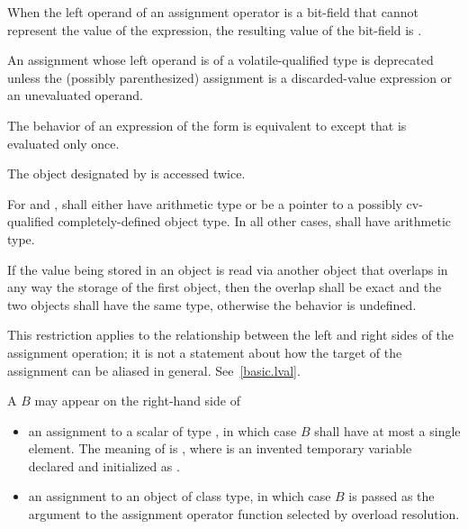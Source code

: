 \pnum
{}%
When the left operand of an assignment operator
is a bit-field that cannot represent the value of the expression, the
resulting value of the bit-field is
.

\pnum
An assignment whose left operand is of
a volatile-qualified type is deprecated
unless the (possibly parenthesized) assignment is a discarded-value expression or
an unevaluated operand.

\pnum
The behavior of an expression of the form 
is equivalent to  except
that  is evaluated only once.
\begin{note}
The object designated by  is accessed twice.
\end{note}
For \tcode{+=} and \tcode{-=},
 shall either have arithmetic type or be a pointer to a
possibly cv-qualified completely-defined object type. In all other
cases,  shall have arithmetic type.

\pnum
If the value being stored in an object is read via another object that
overlaps in any way the storage of the first object, then the overlap shall be
exact and the two objects shall have the same type, otherwise the behavior is
undefined.
\begin{note}
This restriction applies to the relationship
between the left and right sides of the assignment operation; it is not a
statement about how the target of the assignment can be aliased in general.
See~\ref{basic.lval}.
\end{note}

\pnum
A  $B$ may appear on the right-hand side of

\begin{itemize}
\item
an assignment to a scalar of type , in which case $B$
shall have at most a single element.
The meaning of  is ,
where  is an invented temporary variable
declared and initialized as .

\item
an assignment to an object of class type, in which case $B$
is passed as the argument to the assignment operator function selected by
overload resolution.
\end{itemize}

